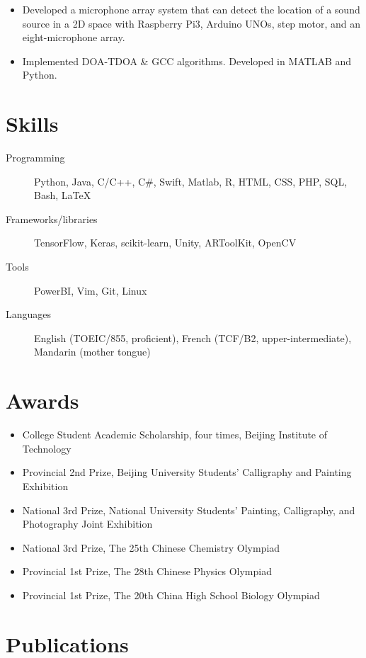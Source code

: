 \documentclass{mycv}
\begin{document}
\begin{itemize}
  \item Developed a microphone array system that can detect the location of a sound source in a 2D space with Raspberry Pi3, Arduino UNOs, step motor, and an eight-microphone array.
  \item Implemented DOA-TDOA \& GCC algorithms. Developed in MATLAB and Python.
\end{itemize}


\section{Skills}

\begin{description}
  \item[Programming] Python, Java, C/C++, C\#, Swift, Matlab, R, HTML, CSS, PHP, SQL, Bash, \LaTeX
  \item[Frameworks/libraries] TensorFlow, Keras, scikit-learn, Unity, ARToolKit, OpenCV
  \item[Tools] PowerBI, Vim, Git, Linux
  \item[Languages] English (TOEIC/855, proficient), French (TCF/B2, upper-intermediate), Mandarin (mother tongue)
\end{description}

\section{Awards}

\begin{itemize}
  \item College Student Academic Scholarship, four times, Beijing Institute of Technology 
  \item Provincial 2nd Prize, Beijing University Students’ Calligraphy and Painting Exhibition 
  \item National 3rd Prize, National University Students’ Painting, Calligraphy, and Photography Joint Exhibition 
  \item National 3rd Prize, The 25th Chinese Chemistry Olympiad 
  \item Provincial 1st Prize, The 28th Chinese Physics Olympiad 
  \item Provincial 1st Prize, The 20th China High School Biology Olympiad 
\end{itemize}

\section{Publications}%
\end{document}
